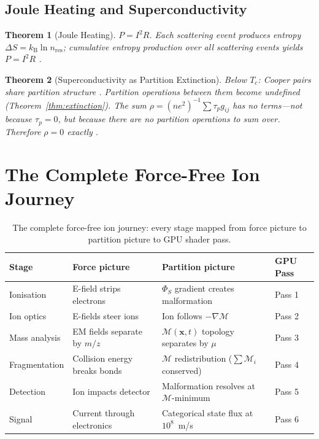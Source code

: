 \documentclass[11pt,twocolumn,a4paper]{article}
\newtheorem{theorem}{Theorem}[section]
\theoremstyle{definition}
\theoremstyle{remark}
\newcommand{\kB}{k_{\mathrm{B}}}
\newcommand{\Depth}{\mathcal{M}}
\newcommand{\partinert}{\mu}
\newcommand{\taup}{\tau_p}
\newcommand{\Spotential}{\Phi_S}
\begin{document}
\subsection{Joule Heating and Superconductivity}

\begin{theorem}[Joule Heating]
$P = I^2R$. Each scattering event produces entropy $\Delta S = \kB\ln n_{\mathrm{res}}$; cumulative entropy production over all scattering events yields $P = I^2R$ \citep{boltzmann1877}.
\end{theorem}

\begin{theorem}[Superconductivity as Partition Extinction]
Below $T_c$: Cooper pairs share partition structure \citep{BCS1957}. Partition operations between them become undefined (Theorem~\ref{thm:extinction}). The sum $\rho = (ne^2)^{-1}\sum\taup g_{ij}$ has \emph{no terms}---not because $\taup = 0$, but because there are no partition operations to sum over. Therefore $\rho = 0$ exactly \citep{onnes1911}.
\end{theorem}

\section{The Complete Force-Free Ion Journey}
\label{sec:journey}

\begin{table}[!htbp]
\centering
\caption{The complete force-free ion journey: every stage mapped from force picture to partition picture to GPU shader pass.}
\label{tab:journey}
\small
\begin{tabular}{llll}
\toprule
\textbf{Stage} & \textbf{Force picture} & \textbf{Partition picture} & \textbf{GPU Pass} \\
\midrule
Ionisation & E-field strips electrons & $\Spotential$ gradient creates malformation & Pass 1 \\
Ion optics & E-fields steer ions & Ion follows $-\nabla\Depth$ & Pass 2 \\
Mass analysis & EM fields separate by $m/z$ & $\Depth(\mathbf{x},t)$ topology separates by $\partinert$ & Pass 3 \\
Fragmentation & Collision energy breaks bonds & $\Depth$ redistribution ($\sum\Depth_i$ conserved) & Pass 4 \\
Detection & Ion impacts detector & Malformation resolves at $\Depth$-minimum & Pass 5 \\
Signal & Current through electronics & Categorical state flux at $10^8$~m/s & Pass 6 \\
\bottomrule
\end{tabular}
\end{table}
\end{document}
